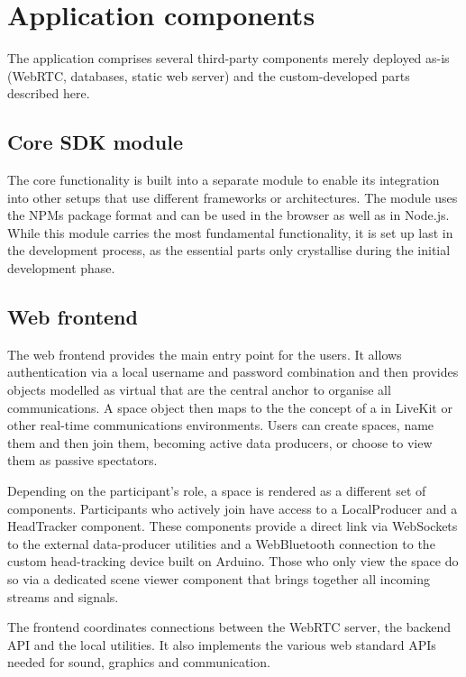 \section{Application components}
\label{sec:application-components}

The application comprises several third-party components merely deployed as-is (WebRTC, databases, static web server) and the custom-developed parts described here.

\subsection{Core SDK module}

The core functionality is built into a separate module to enable its integration into other setups that use different frameworks or architectures.
The module uses the \ac{NPM}\textquotesingle s package format and can be used in the browser as well as in Node.js.
While this module carries the most fundamental functionality, it is set up last in the development process, as the essential parts only crystallise during the initial development phase.

\subsection{Web frontend}

The web frontend provides the main entry point for the users.
It allows authentication via a local username and password combination and then provides objects modelled as virtual  that are the central anchor to organise all communications.
A space object then maps to the the concept of a  in LiveKit or other real-time communications environments.
Users can create spaces, name them and then join them, becoming active data producers, or choose to view them as passive spectators.

Depending on the participant's role, a space is rendered as a different set of components.
Participants who actively join have access to a LocalProducer and a HeadTracker component.
These components provide a direct link via WebSockets to the external data-producer utilities and a WebBluetooth connection to the custom head-tracking device built on Arduino.
Those who only view the space do so via a dedicated scene viewer component that brings together all incoming streams and signals.

The frontend coordinates connections between the WebRTC server, the backend \ac{API} and the local utilities.
It also implements the various web standard \ac{API}s needed for sound, graphics and communication.

